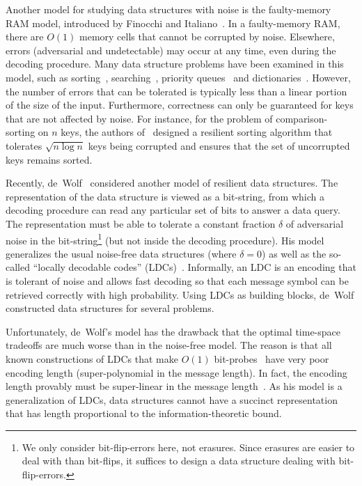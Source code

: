 \documentclass[11pt,english]{article}
\theoremstyle{definition}
\theoremstyle{remark}
\begin{document}
Another model for studying data structures with noise is the faulty-memory RAM model, 
introduced by Finocchi and Italiano~\cite{finocchi&italiano:faults}. 
In a faulty-memory RAM, there are $O(1)$ memory cells that cannot
be corrupted by noise. Elsewhere, errors (adversarial and undetectable)
may occur at any time, even during the decoding procedure.
Many data structure problems have been examined in this model, 
such as sorting~\cite{fgi:resilientsorting}, searching~\cite{fgi:resilientsearch},
priority queues~\cite{jmm:resilientpriority} and dictionaries~\cite{bffgijmm:resilientdict}.
However, the number of errors that can be tolerated is typically less than
a linear portion of the size of the input. Furthermore, correctness
can only be guaranteed for keys that are not affected by noise. For
instance, for the problem of comparison-sorting on $n$ keys, the
authors of~\cite{fgi:resilientsorting} designed a resilient sorting
algorithm that tolerates $\sqrt{n\log n}$ keys being corrupted and
ensures that the set of uncorrupted keys remains sorted.

Recently, de~Wolf~\cite{wolf:ecdata} considered another model of
resilient data structures. The representation of the data structure
is viewed as a bit-string, from which a decoding procedure can read
any particular set of bits to answer a data query. The representation
must be able to tolerate a constant fraction $\delta$ of adversarial noise in the bit-string\footnote{We only consider bit-flip-errors here, not erasures. Since erasures
are easier to deal with than bit-flips, it suffices to design a data
structure dealing with bit-flip-errors.} 
(but not inside the decoding procedure). His model generalizes the
usual noise-free data structures (where $\delta=0$) as well as the
so-called ``locally decodable codes'' (LDCs)~\cite{katz&trevisan:ldc}.
Informally, an LDC is an encoding that is tolerant of noise and allows
fast decoding so that each message symbol can be retrieved correctly
with high probability. Using LDCs as building blocks, de~Wolf constructed
data structures for several problems. 

Unfortunately, de~Wolf's model has the drawback that the optimal
time-space tradeoffs are much worse than in the noise-free model.
The reason is that all known constructions of LDCs that make $O(1)$
bit-probes~\cite{yekhanin:3ldcj,efremenko:ldc} have very poor encoding
length (super-polynomial in the message length). In fact, the encoding
length provably must be super-linear in the message length~\cite{katz&trevisan:ldc,kerenidis&wolf:qldcj,woodruff:ldclower}.
As his model is a generalization of LDCs, data structures cannot have
a succinct representation that has length proportional to the information-theoretic
bound.
\end{document}
